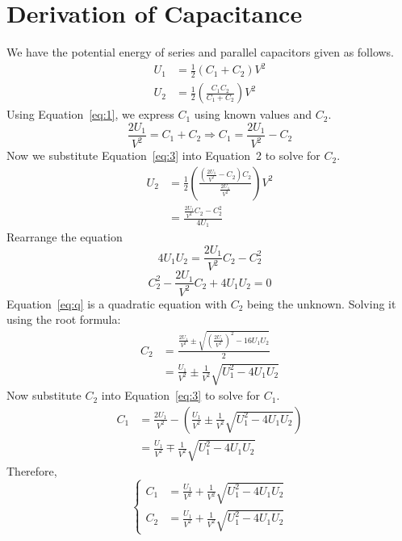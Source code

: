 \documentclass[12pt]{article}
\begin{document}
\section{Derivation of Capacitance}

We have the potential energy of series and parallel capacitors given as follows.
\begin{align}
    U_1 &= \frac{1}{2} (C_1 + C_2) V^2 \\ \label{eq:1}
    U_2 &= \frac{1}{2} \left( \frac{C_1 C_2}{C_1 + C_2} \right) V^2
\end{align}
Using Equation~\ref{eq:1}, we express $C_1$ using known values and $C_2$.
\begin{equation}
    \frac{2U_1}{V^2} = C_1 + C_2 \Rightarrow C_1 = \frac{2U_1}{V^2} - C_2 \label{eq:3}
\end{equation}
Now we substitute Equation~\ref{eq:3} into Equation~2 to solve for $C_2$.
\begin{align*}
    U_2 &= \frac{1}{2} \left(
        \frac{(\frac{2U_1}{V^2} - C_2)C_2}{\frac{2U_1}{V^2}}
    \right) V^2 \\
        &= \frac{\frac{2U_1}{V^2}C_2 - C_2^2}{4U_1}
\end{align*}
Rearrange the equation
\begin{equation*}
    4U_1U_2 = \frac{2U_1}{V^2}C_2 - C_2^2
\end{equation*}
\begin{equation}\label{eq:q}
    C_2^2 - \frac{2U_1}{V^2}C_2 + 4U_1U_2 = 0 
\end{equation}
Equation~\ref{eq:q} is a quadratic equation with $C_2$ being the unknown. Solving it using the root formula:
\begin{align*}
    C_2 &= \frac{\frac{2U_1}{V^2} \pm \sqrt{\left(\frac{2U_1}{V^2}\right)^2 - 16 U_1 U_2}}{2} \\
        &= \frac{U_1}{V^2} \pm \frac{1}{V^2} \sqrt{U_1^2 - 4 U_1 U_2}
\end{align*}
Now substitute $C_2$ into Equation~\ref{eq:3} to solve for $C_1$.
\begin{align*}
    C_1 &= \frac{2U_1}{V^2} - \left(
        \frac{U_1}{V^2} \pm \frac{1}{V^2} \sqrt{U_1^2 - 4 U_1 U_2}
    \right) \\
        &= \frac{U_1}{V^2} \mp \frac{1}{V^2} \sqrt{U_1^2 - 4 U_1 U_2}
\end{align*}
Therefore,
\def\arraystretch{1.5}
\begin{equation*}
    \left\{
    \begin{array}{ll}
        C_1 &= \frac{U_1}{V^2} + \frac{1}{V^2} \sqrt{U_1^2 - 4 U_1 U_2} \\
        C_2 &= \frac{U_1}{V^2} + \frac{1}{V^2} \sqrt{U_1^2 - 4 U_1 U_2}
    \end{array}
    \right.
\end{equation*}
\end{document}
